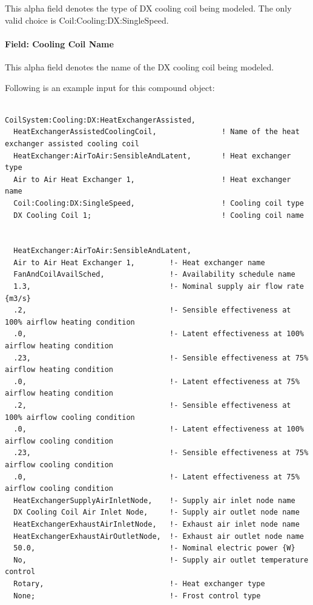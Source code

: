 This alpha field denotes the type of DX cooling coil being modeled. The only valid choice is Coil:Cooling:DX:SingleSpeed.

\paragraph{Field: Cooling Coil Name}\label{field-cooling-coil-name-1}

This alpha field denotes the name of the DX cooling coil being modeled.

Following is an example input for this compound object:

\begin{lstlisting}

CoilSystem:Cooling:DX:HeatExchangerAssisted,
  HeatExchangerAssistedCoolingCoil,               ! Name of the heat exchanger assisted cooling coil
  HeatExchanger:AirToAir:SensibleAndLatent,       ! Heat exchanger type
  Air to Air Heat Exchanger 1,                    ! Heat exchanger name
  Coil:Cooling:DX:SingleSpeed,                    ! Cooling coil type
  DX Cooling Coil 1;                              ! Cooling coil name


  HeatExchanger:AirToAir:SensibleAndLatent,
  Air to Air Heat Exchanger 1,        !- Heat exchanger name
  FanAndCoilAvailSched,               !- Availability schedule name
  1.3,                                !- Nominal supply air flow rate {m3/s}
  .2,                                 !- Sensible effectiveness at 100% airflow heating condition
  .0,                                 !- Latent effectiveness at 100% airflow heating condition
  .23,                                !- Sensible effectiveness at 75% airflow heating condition
  .0,                                 !- Latent effectiveness at 75% airflow heating condition
  .2,                                 !- Sensible effectiveness at 100% airflow cooling condition
  .0,                                 !- Latent effectiveness at 100% airflow cooling condition
  .23,                                !- Sensible effectiveness at 75% airflow cooling condition
  .0,                                 !- Latent effectiveness at 75% airflow cooling condition
  HeatExchangerSupplyAirInletNode,    !- Supply air inlet node name
  DX Cooling Coil Air Inlet Node,     !- Supply air outlet node name
  HeatExchangerExhaustAirInletNode,   !- Exhaust air inlet node name
  HeatExchangerExhaustAirOutletNode,  !- Exhaust air outlet node name
  50.0,                               !- Nominal electric power {W}
  No,                                 !- Supply air outlet temperature control
  Rotary,                             !- Heat exchanger type
  None;                               !- Frost control type



\end{lstlisting}
